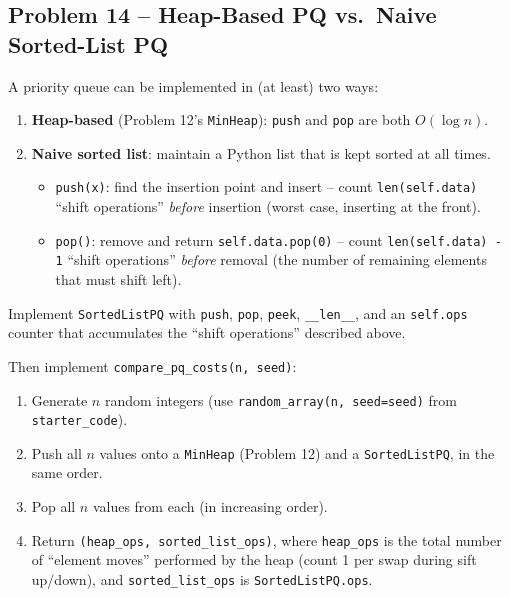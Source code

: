 \documentclass[11pt]{article}
\begin{document}
\newpage

\subsection*{Problem 14 -- Heap-Based PQ vs.\ Naive Sorted-List PQ}

A priority queue can be implemented in (at least) two ways:
\begin{enumerate}
    \item \textbf{Heap-based} (Problem 12's \texttt{MinHeap}): \texttt{push} and
    \texttt{pop} are both $O(\log n)$.
    \item \textbf{Naive sorted list}: maintain a Python list that is kept sorted at all
    times.
    \begin{itemize}
        \item \texttt{push(x)}: find the insertion point and insert -- count
        \texttt{len(self.data)} ``shift operations'' \emph{before} insertion (worst case,
        inserting at the front).
        \item \texttt{pop()}: remove and return \texttt{self.data.pop(0)} -- count
        \texttt{len(self.data) - 1} ``shift operations'' \emph{before} removal (the number
        of remaining elements that must shift left).
    \end{itemize}
\end{enumerate}

Implement \texttt{SortedListPQ} with \texttt{push}, \texttt{pop}, \texttt{peek},
\texttt{\_\_len\_\_}, and an \texttt{self.ops} counter that accumulates the ``shift
operations'' described above.

Then implement \texttt{compare\_pq\_costs(n, seed)}:
\begin{enumerate}
    \item Generate $n$ random integers (use \texttt{random\_array(n, seed=seed)} from
    \texttt{starter\_code}).
    \item Push all $n$ values onto a \texttt{MinHeap} (Problem 12) and a
    \texttt{SortedListPQ}, in the same order.
    \item Pop all $n$ values from each (in increasing order).
    \item Return \texttt{(heap\_ops, sorted\_list\_ops)}, where \texttt{heap\_ops} is the
    total number of ``element moves'' performed by the heap (count 1 per swap during sift
    up/down), and \texttt{sorted\_list\_ops} is \texttt{SortedListPQ.ops}.
\end{enumerate}
\end{document}
